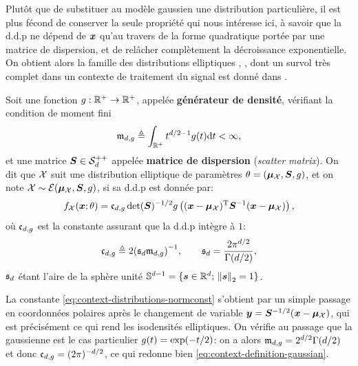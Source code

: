 Plutôt que de substituer au modèle gaussien une distribution particulière, il est plus fécond de conserver la seule propriété qui nous intéresse ici, à savoir que la d.d.p ne dépend de $\boldsymbol{x}$ qu'au travers de la forme quadratique portée par une matrice de dispersion, et de relâcher complètement la décroissance exponentielle. On obtient alors la famille des distributions elliptiques , , dont un survol très complet dans un contexte de traitement du signal est donné dans .

\begin{definition}
\label{def:context-distributions-elliptical}
  Soit une fonction $g:\mathbb{R}^+\to\mathbb{R}^+$, appelée \textbf{générateur de densité}, vérifiant la condition de moment fini
  \begin{equation}
    \mathfrak{m}_{d,g}
    \triangleq
    \int_{\mathbb{R}^+}
    t^{d/2-1}g(t)\mathrm{d} t
    <
    \infty,
    \label{eq:context-distributions-momentfini}
  \end{equation}
  et une matrice $\boldsymbol{S}\in\mathcal{S}_{d}^{++}$ appelée \textbf{matrice de dispersion} (\textit{scatter matrix}). On dit que $\mathcal{X}$ suit une distribution elliptique de paramètres $\theta=(\boldsymbol{\mu}_{\mathcal{X}},\boldsymbol{S},g)$, et on note $\mathcal{X}\sim\mathcal{E}(\boldsymbol{\mu}_{\mathcal{X}},\boldsymbol{S},g)$, si sa d.d.p est donnée par:
\begin{equation}
  f_{\mathcal{X}}(\boldsymbol{x}; \theta)
  =
  \mathfrak{c}_{d,g}
  \operatorname{\operatorname{det}}(\boldsymbol{S})^{-1/2}
  g\left(
    (\boldsymbol{x}-\boldsymbol{\mu}_{\mathcal{X}})^{\mathrm{T}} {\boldsymbol{S}}^{-1} (\boldsymbol{x}-\boldsymbol{\mu}_{\mathcal{X}})
  \right),
  \label{eq:context-distributions-ellipticalpdf}
\end{equation}
  où $\mathfrak{c}_{d,g}$ est la constante assurant que la d.d.p intègre à $1$:
\begin{equation}
  \mathfrak{c}_{d,g}
  \triangleq
  2{\left(\mathfrak{s}_{d}\mathfrak{m}_{d,g}\right)}^{-1},
  \qquad
  \mathfrak{s}_{d} = \frac{2\pi^{d/2}}{\Gamma(d/2)},
  \label{eq:context-distributions-normconst}
\end{equation}
  $\mathfrak{s}_{d}$ étant l'aire de la sphère unité $\mathbb{S}^{d-1}=\{\boldsymbol{s}\in\mathbb{R}^d;\,\left\lVert\boldsymbol{s}\right\rVert_2=1\}$.
\end{definition}

\begin{remark}
  La constante \cref{eq:context-distributions-normconst} s'obtient par un simple passage en coordonnées polaires après le changement de variable $\boldsymbol{y}=\boldsymbol{S}^{-1/2}(\boldsymbol{x}-\boldsymbol{\mu}_{\mathcal{X}})$, qui est précisément ce qui rend les isodensités elliptiques. On vérifie au passage que la gaussienne est le cas particulier $g(t)=\exp(-t/2)$: on a alors $\mathfrak{m}_{d,g}=2^{d/2}\Gamma(d/2)$ et donc $\mathfrak{c}_{d,g}=(2\pi)^{-d/2}$, ce qui redonne bien \cref{eq:context-definition-gaussian}.
\end{remark}

